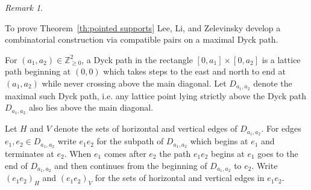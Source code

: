 \documentclass[11pt]{amsart}
\theoremstyle{remark}
\newtheorem{remark}[theorem]{Remark}
\numberwithin{equation}{section}
\newcommand{\ZZ}{\mathbb{Z}}
\begin{document}
\begin{remark}
\begin{center}
    \quad\quad\quad\quad
  \end{center}
\end{remark}

To prove Theorem~\ref{th:pointed supports} Lee, Li, and Zelevinsky develop a
combinatorial construction via compatible pairs on a maximal Dyck path.  

For $(a_1,a_2)\in\ZZ_{\ge0}^2$, a Dyck path in the rectangle
$[0,a_1]\times[0,a_2]$ is a lattice path beginning at $(0,0)$ which takes steps
to the east and north to end at $(a_1,a_2)$ while never crossing above the main
diagonal.  Let $D_{a_1,a_2}$ denote the maximal such Dyck path, i.e. any lattice
point lying strictly above the Dyck path $D_{a_1,a_2}$ also lies above the main
diagonal.  

Let $H$ and $V$ denote the sets of horizontal and vertical edges of
$D_{a_1,a_2}$.  For edges $e_1,e_2\in D_{a_1,a_2}$ write $e_1e_2$ for the
subpath of $D_{a_1,a_2}$ which begins at $e_1$ and terminates at $e_2$.  When
$e_1$ comes after $e_2$ the path $e_1e_2$ begins at $e_1$ goes to the end of
$D_{a_1,a_2}$ and then continues from the beginning of $D_{a_1,a_2}$ to $e_2$.
Write $(e_1e_2)_H$ and $(e_1e_2)_V$ for the sets of horizontal and vertical
edges in $e_1e_2$.
\end{document}
